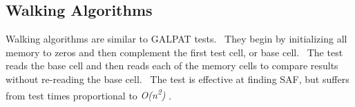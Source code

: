 \subsection{Walking Algorithms}
Walking algorithms are similar to GALPAT tests.  They begin by initializing all memory to zeros and then complement the first test cell, or base cell.  The test reads the base cell and then reads each of the memory cells to compare results without re-reading the base cell.  The test is effective at finding SAF, but suffers from test times proportional to \textit{O(n\textsuperscript{2})} \cite{VanDeGoor1991}.  

